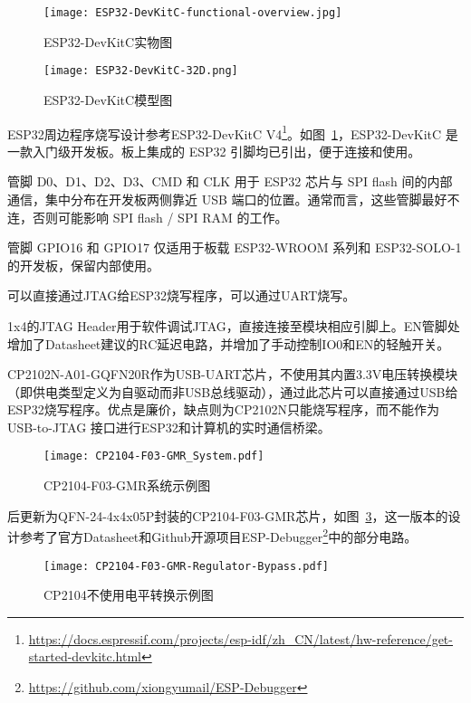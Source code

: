 \begin{figure}[htbp]
    \centering
    \texttt{[image: ESP32-DevKitC-functional-overview.jpg]}
    \caption{ESP32-DevKitC实物图}
    \label{fig:ESP32-1}
\end{figure}


\begin{figure}[htbp]
    \centering
    \texttt{[image: ESP32-DevKitC-32D.png]}
    \caption{ESP32-DevKitC模型图}
    \label{fig:ESP32-2}
\end{figure}

ESP32周边程序烧写设计参考ESP32-DevKitC V4\footnote{\url{https://docs.espressif.com/projects/esp-idf/zh_CN/latest/hw-reference/get-started-devkitc.html}}。如图~\ref{fig:ESP32-1}，ESP32-DevKitC 是一款入门级开发板。板上集成的 ESP32 引脚均已引出，便于连接和使用。

管脚 D0、D1、D2、D3、CMD 和 CLK 用于 ESP32 芯片与 SPI flash 间的内部通信，集中分布在开发板两侧靠近 USB 端口的位置。通常而言，这些管脚最好不连，否则可能影响 SPI flash / SPI RAM 的工作。

管脚 GPIO16 和 GPIO17 仅适用于板载 ESP32-WROOM 系列和 ESP32-SOLO-1 的开发板，保留内部使用。

可以直接通过JTAG给ESP32烧写程序，可以通过UART烧写。

1x4的JTAG Header用于软件调试JTAG，直接连接至模块相应引脚上。EN管脚处增加了Datasheet建议的RC延迟电路，并增加了手动控制IO0和EN的轻触开关。

CP2102N-A01-GQFN20R作为USB-UART芯片，不使用其内置3.3V电压转换模块（即供电类型定义为自驱动而非USB总线驱动），通过此芯片可以直接通过USB给ESP32烧写程序。优点是廉价，缺点则为CP2102N只能烧写程序，而不能作为 USB-to-JTAG 接口进行ESP32和计算机的实时通信桥梁。

\begin{figure}[htbp]
    \centering
    \texttt{[image: CP2104-F03-GMR\_System.pdf]}
    \caption{CP2104-F03-GMR系统示例图}
    \label{fig:CP2104-F03-GMR}
\end{figure}

后更新为QFN-24-4x4x05P封装的CP2104-F03-GMR芯片，如图~\ref{fig:CP2104-F03-GMR}，这一版本的设计参考了官方Datasheet和Github开源项目ESP-Debugger\footnote{\url{https://github.com/xiongyumail/ESP-Debugger}}中的部分电路。

\begin{figure}[htbp]
    \centering
    \texttt{[image: CP2104-F03-GMR-Regulator-Bypass.pdf]}
    \caption{CP2104不使用电平转换示例图}
    \label{fig:CP2104-Regulator-Bypass}
\end{figure}

